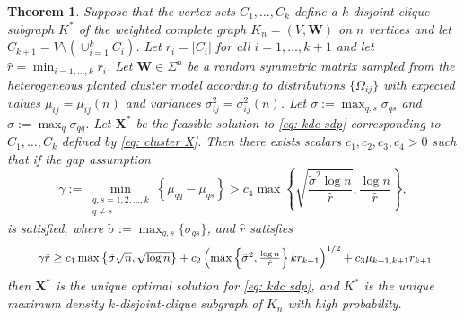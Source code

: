 \documentclass[twoside,11pt]{article}
\newtheorem{theorem}{Theorem}[section]
\newcommand{\bs}{\boldsymbol}
\newcommand{\X}{\bs {X}}
\newcommand{\0}{\bs{0}}
\newcommand{\rbra}[1]{\ensuremath{\left( #1 \right)}} %
\newcommand{\bra}[1]{\ensuremath{\left\{ #1 \right\}}} %
\newcommand{\kdc}{\(k\)-disjoint-clique }
\begin{document}
{\begin{theorem} \label{thm: rec}
	Suppose that the vertex sets \(C_1,\dots,C_k\) define a \(k\)-disjoint-clique subgraph \(K^*\) of the weighted
	complete graph
	\(K_n = (V,\bs W)\) on \(n\) vertices and let \(C_{k+1} = V \setminus \left(\cup_{i=1}^k C_i \right)\). Let \(r_i = |C_i|\) for all
	\(i=1,\dots,k+1\) and let \(\hat{r} = \min_{i=1,\dots,k} r_i\).
	Let \(\bs{W} \in \Sigma^n\)
	be a random symmetric matrix sampled from the heterogeneous planted cluster model according to distributions \(\{\Omega_{ij} \}\) with expected values \(\mu_{ij} = \mu_{ij}(n)\) and variances
	\(\sigma_{ij}^2 = \sigma_{ij}^2(n)\).
	Let $\tilde \sigma := \max_{q,s} \sigma_{qs}$ and
	$\hat \sigma := \max_{q} \sigma_{qq}$.
	Let \(\X^*\) be the feasible solution to \eqref{eq: kdc sdp} corresponding to \(C_1,\dots,C_k\) defined by
	\eqref{eq: cluster X}. Then there exists scalars \(c_1, c_2, c_3, c_4 > 0\) such that if
	the gap assumption
	\begin{equation}
	\label{eq:brendan_27_mod}
		\gamma := \min_{\substack{q,s=1,2,\dots, k \\ q\neq s}} \bra{\mu_{qq} - \mu_{qs}}
		> c_4 \max \bra{ \sqrt{  \frac{\tilde \sigma^2 \log n }{\hat r} },
		\frac{\log n }{\hat r} },
	\end{equation}
		is satisfied,
		where $\tilde \sigma := \max_{q,s}\{ \sigma_{qs}\}$,
		and $\hat r$ satisfies
	\begin{equation}\label{eq:smallest_largest}
	\resizebox{0.92\textwidth}{!}{
		\(
		\gamma \hat r \ge %
		{  c_1 \max\left\lbrace \tilde\sigma\sqrt{n},  \sqrt{\log n} \right\rbrace
			+ c_2 \rbra{ \max \bra{\hat\sigma^2, \frac{\log n}{\hat r} } k r_{k+1} }^{1/2} + c_3 \mu_{k+1, k+1} r_{k+1} }		\)}
	\end{equation}
	then \(\bs{X}^*\) is the unique optimal solution for \eqref{eq: kdc sdp}, and \(K^*\) is the unique maximum density \kdc
	subgraph of \(K_n\) with high probability.
\end{theorem}
%

}
\end{document}
